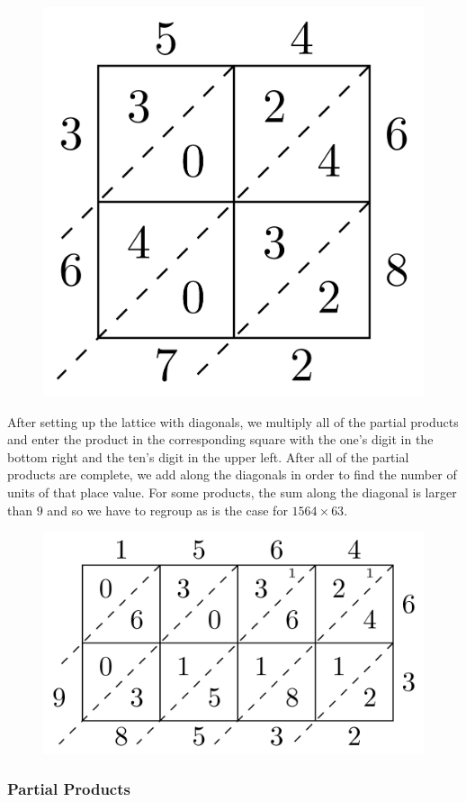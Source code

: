\documentclass[
]{book}
\theoremstyle{definition}
\theoremstyle{definition}
\theoremstyle{definition}
\theoremstyle{definition}
\theoremstyle{remark}
\begin{document}
\begin{figure}

{\centering \includegraphics[width=0.5\linewidth]{tikz/lattice-multiplication-13-16-3} 

}

\end{figure}

After setting up the lattice with diagonals, we multiply all of the partial products and enter the product in the corresponding square with the one's digit in the bottom right and the ten's digit in the upper left. After all of the partial products are complete, we add along the diagonals in order to find the number of units of that place value. For some products, the sum along the diagonal is larger than \(9\) and so we have to regroup as is the case for \(1564 \times 63\).

\begin{figure}

{\centering \includegraphics[width=0.6\linewidth]{tikz/lattice-multiplication-large} 

}

\end{figure}

\hypertarget{partial-products}{%
\subsubsection*{Partial Products}\label{partial-products}}
\end{document}
